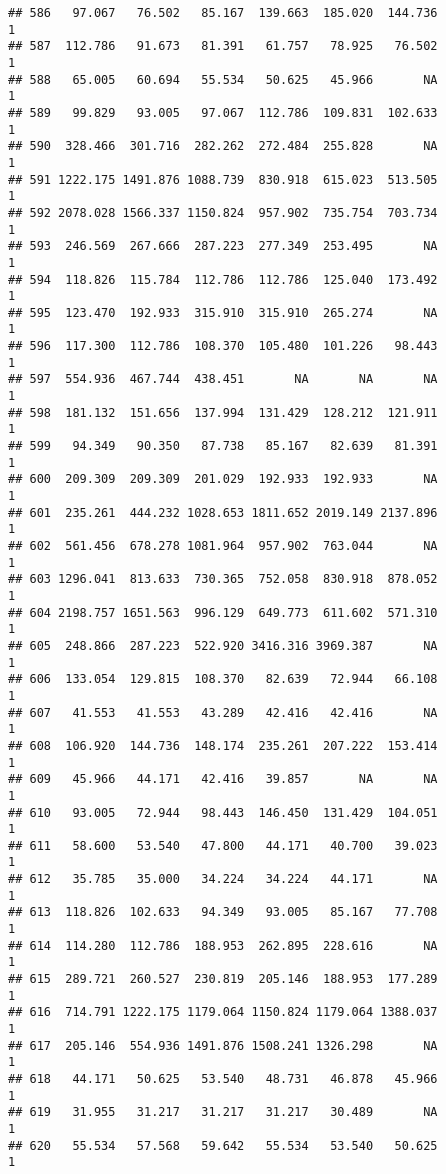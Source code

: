 \documentclass[
]{article}
\begin{document}
\begin{verbatim}
## 586   97.067   76.502   85.167  139.663  185.020  144.736             1
## 587  112.786   91.673   81.391   61.757   78.925   76.502             1
## 588   65.005   60.694   55.534   50.625   45.966       NA             1
## 589   99.829   93.005   97.067  112.786  109.831  102.633             1
## 590  328.466  301.716  282.262  272.484  255.828       NA             1
## 591 1222.175 1491.876 1088.739  830.918  615.023  513.505             1
## 592 2078.028 1566.337 1150.824  957.902  735.754  703.734             1
## 593  246.569  267.666  287.223  277.349  253.495       NA             1
## 594  118.826  115.784  112.786  112.786  125.040  173.492             1
## 595  123.470  192.933  315.910  315.910  265.274       NA             1
## 596  117.300  112.786  108.370  105.480  101.226   98.443             1
## 597  554.936  467.744  438.451       NA       NA       NA             1
## 598  181.132  151.656  137.994  131.429  128.212  121.911             1
## 599   94.349   90.350   87.738   85.167   82.639   81.391             1
## 600  209.309  209.309  201.029  192.933  192.933       NA             1
## 601  235.261  444.232 1028.653 1811.652 2019.149 2137.896             1
## 602  561.456  678.278 1081.964  957.902  763.044       NA             1
## 603 1296.041  813.633  730.365  752.058  830.918  878.052             1
## 604 2198.757 1651.563  996.129  649.773  611.602  571.310             1
## 605  248.866  287.223  522.920 3416.316 3969.387       NA             1
## 606  133.054  129.815  108.370   82.639   72.944   66.108             1
## 607   41.553   41.553   43.289   42.416   42.416       NA             1
## 608  106.920  144.736  148.174  235.261  207.222  153.414             1
## 609   45.966   44.171   42.416   39.857       NA       NA             1
## 610   93.005   72.944   98.443  146.450  131.429  104.051             1
## 611   58.600   53.540   47.800   44.171   40.700   39.023             1
## 612   35.785   35.000   34.224   34.224   44.171       NA             1
## 613  118.826  102.633   94.349   93.005   85.167   77.708             1
## 614  114.280  112.786  188.953  262.895  228.616       NA             1
## 615  289.721  260.527  230.819  205.146  188.953  177.289             1
## 616  714.791 1222.175 1179.064 1150.824 1179.064 1388.037             1
## 617  205.146  554.936 1491.876 1508.241 1326.298       NA             1
## 618   44.171   50.625   53.540   48.731   46.878   45.966             1
## 619   31.955   31.217   31.217   31.217   30.489       NA             1
## 620   55.534   57.568   59.642   55.534   53.540   50.625             1

\end{verbatim}
\end{document}
